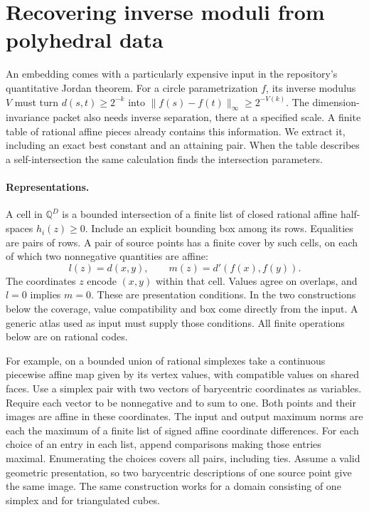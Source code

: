 \section{Recovering inverse moduli from polyhedral data}\label{sec:pairpoly}

An embedding comes with a particularly expensive input in the repository's quantitative Jordan theorem. For a circle parametrization $f$, its inverse modulus $V$ must turn $d(s,t)\ge 2^{-k}$ into $\|f(s)-f(t)\|_\infty\ge 2^{-V(k)}$. The dimension-invariance packet also needs inverse separation, there at a specified scale. A finite table of rational affine pieces already contains this information. We extract it, including an exact best constant and an attaining pair. When the table describes a self-intersection the same calculation finds the intersection parameters.

\paragraph{Representations.}
A cell in $\mathbb Q^D$ is a bounded intersection of a finite list of closed rational affine half-spaces $h_i(z)\ge0$. Include an explicit bounding box among its rows. Equalities are pairs of rows. A pair of source points has a finite cover by such cells, on each of which two nonnegative quantities are affine:
\[
     l(z)=d(x,y),\qquad m(z)=d'(f(x),f(y)).
\]
The coordinates $z$ encode $(x,y)$ within that cell. Values agree on overlaps, and $l=0$ implies $m=0$. These are presentation conditions. In the two constructions below the coverage, value compatibility and box come directly from the input. A generic atlas used as input must supply those conditions. All finite operations below are on rational codes.

For example, on a bounded union of rational simplexes take a continuous piecewise affine map given by its vertex values, with compatible values on shared faces. Use a simplex pair with two vectors of barycentric coordinates as variables. Require each vector to be nonnegative and to sum to one. Both points and their images are affine in these coordinates. The input and output maximum norms are each the maximum of a finite list of signed affine coordinate differences. For each choice of an entry in each list, append comparisons making those entries maximal. Enumerating the choices covers all pairs, including ties. Assume a valid geometric presentation, so two barycentric descriptions of one source point give the same image. The same construction works for a domain consisting of one simplex and for triangulated cubes.

